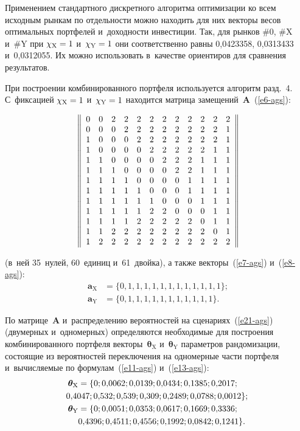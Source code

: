 \begin{multicols}{2}
  Применением стандартного дискретного алгоритма оптимизации ко всем 
исходным рынкам по отдельности можно находить для них векторы весов 
оптимальных портфелей и~доходности инвестиции. Так, для рынков \#0, \#X 
и~\#Y при $\chi_{\mathrm{X}}\hm=1$ и~$\chi_{\mathrm{Y}}\hm=1$ они 
соответственно равны 0{,}0423358, 0{,}0313433 и~0{,}0312055. Их можно 
использовать в~качестве ориентиров для сравнения результатов. 
  
  
  При построении комбинированного портфеля используется алгоритм разд.~4. 
С~фиксацией $\chi_{\mathrm{X}}\hm=1$ и~$\chi_{\mathrm{Y}}\hm=1$ 
находится матрица замещений~$\mathbf{A}$~(\ref{e6-ags}):

\noindent
  $$
  \left\|
  \begin{array}{cccccccccccc}
0&0&2&2&2&2&2&2&2&2&2&2\\
0&0&0&2&2&2&2&2&2&2&2&1\\
1&0&0&0&2&2&2&2&2&2&2&1\\
1&0&0&0&0&2&2&2&2&2&1&1\\
1&1&0&0&0&0&2&2&2&1&1&1\\
1&1&1&0&0&0&0&2&2&1&1&1\\
1&1&1&1&0&0&0&0&1&1&1&1\\
1&1&1&1&1&0&0&0&1&1&1&1\\
1&1&1&1&1&1&0&0&0&1&1&1\\
1&1&1&1&1&2&2&0&0&0&1&1\\
1&1&1&1&2&2&2&2&2&0&1&1\\
1&1&2&2&2&2&2&2&2&2&0&1\\
1&2&2&2&2&2&2&2&2&2&2&2
\end{array}
\right\|
\vspace*{1pt}
$$

\pagebreak

\noindent
(в~ней 35~нулей, 60~единиц и~61~двойка), а также векторы~(\ref{e7-ags}) 
и~(\ref{e8-ags}):
\begin{align*}
\boldsymbol{a}_{\mathrm{X}} &= \{0, 1, 1, 1, 1, 1, 1, 1, 1, 1, 1, 1, 1\};\\ 
\boldsymbol{a}_{\mathrm{Y}} &= \{0, 1, 1, 1, 1, 1, 1, 1, 1, 1, 1, 1\}.
\end{align*}
  
  По матрице~$\mathbf{A}$ и~распределению вероятностей на 
сценариях~(\ref{e21-ags}) (двумерных и~одномерных) определяются 
необходимые для построения комбинированного портфеля 
векторы~$\boldsymbol{\theta}_{\mathrm{X}}$ 
и~$\boldsymbol{\theta}_{\mathrm{Y}}$ параметров рандомизации, состоящие из 
вероятностей переключения на одномерные части портфеля и~вы\-чис\-ля\-емые по 
формулам~(\ref{e11-ags}) и~(\ref{e13-ags}): 
  \begin{align*}
  \boldsymbol{\theta}_{\mathrm{X}} &= \{0; 0{,}0062; 0{,}0139; 
  0{,}0434; 0{,}1385;    0{,}2017;\\
  &\hspace*{-5mm}0{,}4047;  0{,}532; 0{,}539; 0{,}309; 0{,}2489; 0{,}0788; 0{,}0012\};\\
  \boldsymbol{\theta}_{\mathrm{Y}} &= \{0; 0{,}0051; 0{,}0353; 0{,}0617; 
  0{,}1669; 0{,}3336;\\
    & 0{,}4396;  0{,}4511; 0{,}4556; 0{,}1992; 0{,}0842; 0{,}1241\}. 
  \end{align*}
  

\end{multicols}
